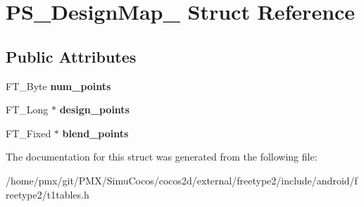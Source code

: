 \hypertarget{structPS__DesignMap__}{}\section{P\+S\+\_\+\+Design\+Map\+\_\+ Struct Reference}
\label{structPS__DesignMap__}
\subsection*{Public Attributes}
\begin{DoxyCompactItemize}
\item 
\mbox{\label{structPS__DesignMap___a505a70dd0f497f177fffca9bc4e5d0a5}} 
F\+T\+\_\+\+Byte {\bfseries num\+\_\+points}
\item 
\mbox{\label{structPS__DesignMap___ab1d0ec98772c46d4f47c7a60fc51597d}} 
F\+T\+\_\+\+Long $\ast$ {\bfseries design\+\_\+points}
\item 
\mbox{\label{structPS__DesignMap___a6de91742f63eeb3f52f32ce5626b71b5}} 
F\+T\+\_\+\+Fixed $\ast$ {\bfseries blend\+\_\+points}
\end{DoxyCompactItemize}


The documentation for this struct was generated from the following file\+:\begin{DoxyCompactItemize}
\item 
/home/pmx/git/\+P\+M\+X/\+Simu\+Cocos/cocos2d/external/freetype2/include/android/freetype2/t1tables.\+h\end{DoxyCompactItemize}
